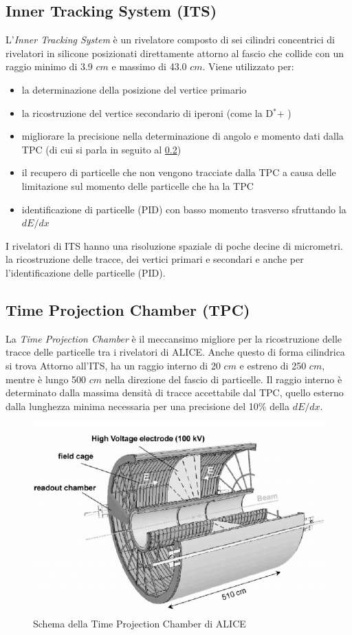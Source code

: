     \subsection{Inner Tracking System (ITS)} \label{ITS}
    L'\textit{Inner Tracking System} è un rivelatore composto di sei cilindri concentrici di rivelatori in silicone posizionati direttamente attorno al fascio che collide con un raggio minimo di 3.9 $cm$ e massimo di 43.0 $cm$. Viene utilizzato per:
    \begin{itemize}
        \item la determinazione della posizione del vertice primario 
        \item la ricostruzione del vertice secondario di iperoni (come la D$^*$+  )
        \item migliorare la precisione nella determinazione di angolo e momento dati dalla TPC (di cui si parla in seguito al \ref{TPC})
        \item il recupero di particelle che non vengono tracciate dalla TPC a causa delle limitazione sul momento delle particelle che ha la TPC
        \item identificazione di particelle (PID) con basso momento trasverso sfruttando la $dE/dx$
    \end{itemize}
    
    I rivelatori di ITS hanno una risoluzione spaziale di poche decine di micrometri. \cite{tesi_barbano}
    la ricostruzione delle tracce, dei vertici primari e secondari e anche per l'identificazione delle particelle (PID). 

    
    \subsection{Time Projection Chamber  (TPC)} \label{TPC}
    La \textit{Time Projection Chamber}  è il meccansimo migliore per la ricostruzione delle tracce delle particelle tra i rivelatori di ALICE. Anche questo di forma cilindrica si trova Attorno all'ITS, ha un raggio interno di 20 $cm$ e estreno di 250 $cm$, mentre è lungo 500 $cm$ nella direzione del fascio di particelle. Il raggio interno è determinato dalla massima densità di tracce accettabile dal TPC, quello esterno dalla lunghezza minima necessaria per una precisione del 10$\%$ della $dE/dx$. 
     
     \begin{figure}[htbp]
        \centering
        \includegraphics[width=0.6\linewidth]{ALICE/ALICE-TPC-detector.png}
        \caption{Schema della Time Projection Chamber di ALICE}
        \label{fig:TPCcomplex}
    \end{figure}
    
